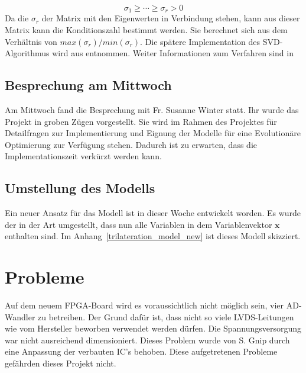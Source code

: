 \documentclass[a4paper,12pt,fleqn]{article}
\begin{document}
\begin{equation}
\sigma_1\geq\cdots\geq\sigma_r> 0
\end{equation}
%
Da die $\sigma_r$ der Matrix mit den Eigenwerten in Verbindung stehen, kann aus dieser Matrix kann die Konditionszahl bestimmt werden. Sie berechnet sich aus dem Verhältnis von $ max(\sigma_r) / min(\sigma_r) $. 
Die spätere Implementation des SVD-Algorithmus wird aus \cite{press2007numerical} entnommen. Weiter Informationen zum Verfahren sind in \cite[Kaptiel 4.6.3]{bronstejn2012taschenbuch}
%
\subsection{Besprechung am Mittwoch}
Am Mittwoch fand die Besprechung mit Fr. Susanne Winter statt. Ihr wurde das Projekt in groben Zügen vorgestellt. Sie wird im Rahmen des Projektes für Detailfragen zur Implementierung und Eignung der Modelle für eine Evolutionäre Optimierung zur Verfügung stehen. Dadurch ist zu erwarten, dass die Implementationszeit verkürzt werden kann.
%
\subsection{Umstellung des Modells}
%
Ein neuer Ansatz für das Modell ist in dieser Woche entwickelt worden. Es wurde der in der Art umgestellt, dass nun alle Variablen in dem Variablenvektor $\mathbf{x}$ enthalten sind. Im Anhang~\ref{trilateration_model_new} ist dieses Modell skizziert. 
%
\section{Probleme}
\label{Problems}
Auf dem neuem FPGA-Board wird es voraussichtlich nicht möglich sein, vier AD-Wandler zu betreiben. Der Grund dafür ist, dass nicht so viele LVDS-Leitungen wie vom Hersteller beworben verwendet werden dürfen. Die Spannungsversorgung war nicht ausreichend dimensioniert. Dieses Problem wurde von S. Gnip durch eine Anpassung der verbauten IC's behoben. Diese aufgetretenen Probleme gefährden dieses Projekt nicht.
%


\newpage


\end{document}
